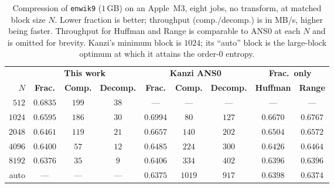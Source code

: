 \documentclass[entropy,article,submit,oneauthor,pdftex]{Definitions/mdpi}
\begin{document}
\begin{table}[ht]
\centering
\caption{Compression of \texttt{enwik9} ($1$\,GB) on an Apple~M3, eight jobs, no
transform, at matched block size $N$. Lower fraction is better; throughput
(comp./decomp.) is in MB/s, higher being faster. Throughput for Huffman and Range is comparable to ANS0 at each $N$
and is omitted for brevity. Kanzi's minimum block is $1024$; its ``auto'' block
is the large-block optimum at which it attains the order-$0$ entropy.}
\renewcommand{\arraystretch}{1.15}
\begin{tabular}{r c c c c c c c c}
\toprule
 & \multicolumn{3}{c}{\textbf{This work}} & \multicolumn{3}{c}{\textbf{Kanzi ANS0}} & \multicolumn{2}{c}{\textbf{Frac.\ only}} \\
\textbf{$N$} & \textbf{Frac.} & \textbf{Comp.} & \textbf{Decomp.} & \textbf{Frac.} & \textbf{Comp.} & \textbf{Decomp.} & \textbf{Huffman} & \textbf{Range} \\
\midrule
$512$  & $0.6835$ & $199$ & $38$ & ---      & ---    & ---   & ---      & ---      \\
$1024$ & $0.6595$ & $186$ & $30$ & $0.6994$ & $80$   & $127$ & $0.6670$ & $0.6767$ \\
$2048$ & $0.6461$ & $119$ & $21$ & $0.6657$ & $140$  & $202$ & $0.6504$ & $0.6572$ \\
$4096$ & $0.6400$ & $57$  & $12$ & $0.6485$ & $224$  & $300$ & $0.6426$ & $0.6464$ \\
$8192$ & $0.6376$ & $35$  & $9$  & $0.6406$ & $334$  & $402$ & $0.6396$ & $0.6396$ \\
auto   & ---      & ---   & ---  & $0.6375$ & $1019$ & $917$ & $0.6398$ & $0.6374$ \\
\bottomrule
\end{tabular}
\label{tab:enwik9}
\end{table}
\end{document}
